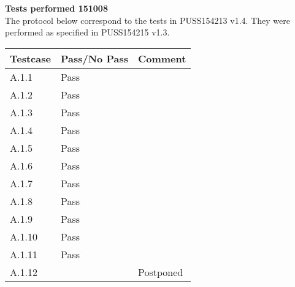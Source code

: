 \renewcommand{\testdate}{151008}
\textbf{ Tests performed \testdate} \\
The protocol below correspond to the tests in PUSS154213 v1.4. They were performed as specified in PUSS154215 v1.3.
\begin{center}
  		\begin{tabular}{| p{3cm} | p{5cm} | p{5cm} |}
    		\hline
	    	\textbf{Testcase}			& \textbf{Pass/No Pass} 	& \textbf{Comment} \\ \hline
    		A.1.1		 						& Pass  										&   \\ \hline
    		A.1.2		 						& Pass 										& 				 \\	\hline
    		A.1.3		 						& Pass 										& 				 \\	\hline
    		A.1.4		 						& Pass 										& 				 \\	\hline
    		A.1.5		 						& Pass 										& 				 \\	\hline
    		A.1.6		 						& Pass 										& 				 \\	\hline
    		A.1.7		 						& Pass 										& 				 \\	\hline
    		A.1.8		 						& Pass 										& 				 \\	\hline
    		A.1.9		 						& Pass 										& 				 \\	\hline
    		A.1.10	 							& Pass 										& 				 \\	\hline
    		A.1.11	 							& Pass 										& 				 \\	\hline
    		A.1.12								&											& Postponed		 \\ \hline
 		 \end{tabular}
\end{center}
	